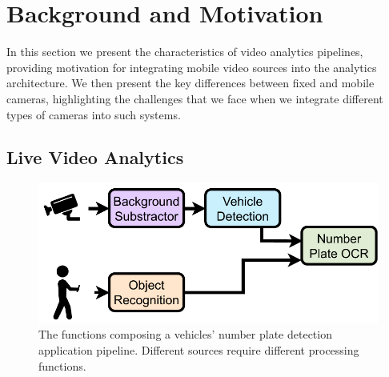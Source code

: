 \section{Background and Motivation}
\label{sec:background_motivation}

In this section we present the characteristics of video analytics pipelines, providing motivation for integrating mobile video sources into the analytics architecture. We then present the key differences between fixed and mobile cameras, highlighting the challenges that we face when we integrate different types of cameras into such systems.

\subsection{Live Video Analytics}


\begin{figure}[t]
    \centering
     \includegraphics[width=0.75\linewidth]{chapters/videojam/images/video_analytics.pdf}
    \caption{The functions composing a vehicles' number plate detection application pipeline. Different sources require different processing functions.}
    \label{fig:video_analytics}
\end{figure}

